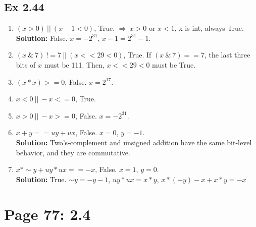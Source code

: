 \subsection{Ex 2.44}
\begin{enumerate}
    \item $(x > 0)\ ||\ (x - 1 < 0)$, True. $\Rightarrow\ x > 0 \text{ or } x < 1$, x is int, always True.\\
        {\color{red}\textbf{Solution: } False. $x = -2^{31}$, $x - 1 = 2^{31} - 1$.}
    \item $(x\ \&\ 7)\ != 7\ ||\ (x << 29 < 0)$, True. If $(x\ \&\ 7) == 7$, the last three bits of $x$ must be 111. Then, $x << 29 < 0$ must be True.
    \item $(x * x) >= 0$, False. $x = 2^{17}$.
    \item $x < 0\ ||\ -x <= 0$, True.
    \item $x > 0\ ||\ -x >= 0$, False. $x = -2^{31}$.
    \item $x + y == uy + ux$, False. $x = 0$, $y = -1$.\\
        {\color{red}\textbf{Solution: }Two's-complement and unsigned addition have the same bit-level behavior, and they are commutative.}
    \item $x * \sim y + uy * ux == -x$, False. $x = 1$, $y = 0$.\\
        {\color{red}\textbf{Solution: } True. $\sim y = -y-1$, $uy*ux = x*y$, $x*(-y)-x+x*y = -x$}
\end{enumerate}

\section{Page 77: 2.4}
